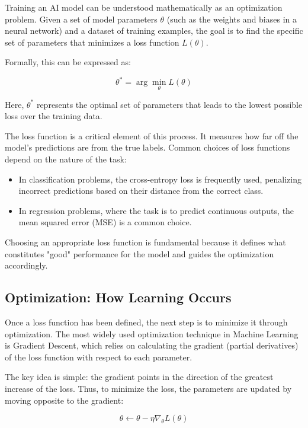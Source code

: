 \documentclass[openany]{book}
\begin{document}
Training an AI model can be understood mathematically as an optimization 
problem. Given a set of model parameters $\theta$ (such as the weights and 
biases in a neural network) and a dataset of training examples, the goal is to 
find the specific set of parameters that minimizes a loss function $L(\theta)$.

Formally, this can be expressed as:

\begin{equation}
\theta^* = \arg\min_{\theta} L(\theta)
\end{equation}

Here, $\theta^*$ represents the optimal set of parameters that leads to the 
lowest possible loss over the training data.

The loss function is a critical element of this process. It measures how far 
off the model's predictions are from the true labels. Common choices of loss 
functions depend on the nature of the task:

\begin{itemize}
    \item In classification problems, the cross-entropy loss is frequently used,
     penalizing incorrect predictions based on their distance from the correct 
     class.
    \item In regression problems, where the task is to predict continuous 
    outputs, the mean squared error (MSE) is a common choice.
\end{itemize}

Choosing an appropriate loss function is fundamental because it defines what 
constitutes "good" performance for the model and guides the optimization 
accordingly.

\subsection{Optimization: How Learning Occurs}

Once a loss function has been defined, the next step is to minimize it through 
optimization. The most widely used optimization technique in Machine Learning 
is Gradient Descent, which relies on calculating the gradient 
(partial derivatives) of the loss function with respect to each parameter.

The key idea is simple: the gradient points in the direction of the greatest 
increase of the loss. Thus, to minimize the loss, the parameters are updated by 
moving opposite to the gradient:

\begin{equation}
\theta \leftarrow \theta - \eta \nabla_\theta L(\theta)
\end{equation}
\end{document}
